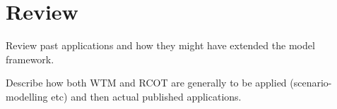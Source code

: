 \section{Review}

Review past applications and how they might have extended the model framework.

Describe how both WTM and RCOT are generally to be applied (scenario-modelling etc) and then actual published applications.
